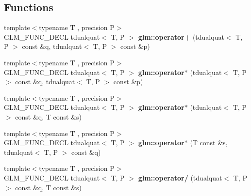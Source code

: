 \subsection*{Functions}
\begin{DoxyCompactItemize}
\item 
\hypertarget{group__gtx__dual__quaternion_ga9d7cfca38c6ff90757705600da3c7972}{{\footnotesize template$<$typename T , precision P$>$ }\\G\-L\-M\-\_\-\-F\-U\-N\-C\-\_\-\-D\-E\-C\-L tdualquat$<$ T, P $>$ {\bfseries glm\-::operator+} (tdualquat$<$ T, P $>$ const \&q, tdualquat$<$ T, P $>$ const \&p)}\label{group__gtx__dual__quaternion_ga9d7cfca38c6ff90757705600da3c7972}

\item 
\hypertarget{group__gtx__dual__quaternion_ga2c224f87242fe82e8ebc17f01aa51126}{{\footnotesize template$<$typename T , precision P$>$ }\\G\-L\-M\-\_\-\-F\-U\-N\-C\-\_\-\-D\-E\-C\-L tdualquat$<$ T, P $>$ {\bfseries glm\-::operator$\ast$} (tdualquat$<$ T, P $>$ const \&q, tdualquat$<$ T, P $>$ const \&p)}\label{group__gtx__dual__quaternion_ga2c224f87242fe82e8ebc17f01aa51126}

\item 
\hypertarget{group__gtx__dual__quaternion_ga5251d67271c42cf52227b6254f3fc8ed}{{\footnotesize template$<$typename T , precision P$>$ }\\G\-L\-M\-\_\-\-F\-U\-N\-C\-\_\-\-D\-E\-C\-L tdualquat$<$ T, P $>$ {\bfseries glm\-::operator$\ast$} (tdualquat$<$ T, P $>$ const \&q, T const \&s)}\label{group__gtx__dual__quaternion_ga5251d67271c42cf52227b6254f3fc8ed}

\item 
\hypertarget{group__gtx__dual__quaternion_ga0aedf77f3e7d45464501570c28df0ed7}{{\footnotesize template$<$typename T , precision P$>$ }\\G\-L\-M\-\_\-\-F\-U\-N\-C\-\_\-\-D\-E\-C\-L tdualquat$<$ T, P $>$ {\bfseries glm\-::operator$\ast$} (T const \&s, tdualquat$<$ T, P $>$ const \&q)}\label{group__gtx__dual__quaternion_ga0aedf77f3e7d45464501570c28df0ed7}

\item 
\hypertarget{group__gtx__dual__quaternion_gad27b1d064624dd6ff1ecc205616323ba}{{\footnotesize template$<$typename T , precision P$>$ }\\G\-L\-M\-\_\-\-F\-U\-N\-C\-\_\-\-D\-E\-C\-L tdualquat$<$ T, P $>$ {\bfseries glm\-::operator/} (tdualquat$<$ T, P $>$ const \&q, T const \&s)}\label{group__gtx__dual__quaternion_gad27b1d064624dd6ff1ecc205616323ba}


\end{DoxyCompactItemize}
